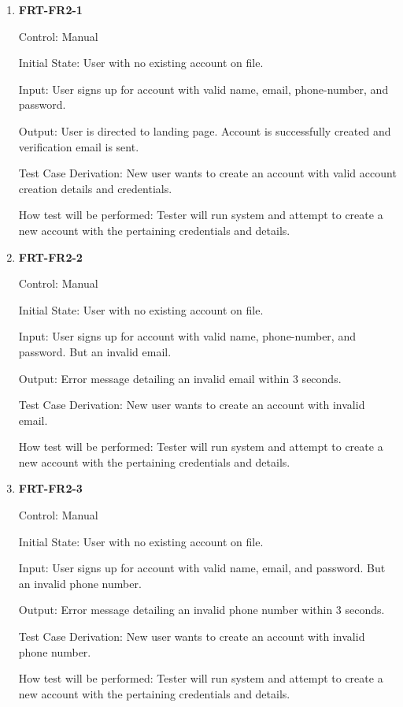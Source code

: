\documentclass[12pt, titlepage]{article}
\begin{document}
\begin{enumerate}

\item{\textbf{FRT-FR2-1}}

Control: Manual
					
Initial State: User with no existing account on file.
					
Input: User signs up for account with valid name, email, phone-number, and password.
					
Output: User is directed to landing page. Account is successfully created and verification email is sent.

Test Case Derivation: New user wants to create an account with valid account creation details and credentials.
					
How test will be performed: Tester will run system and attempt to create a new account with the pertaining credentials and details. 
					
\item{\textbf{FRT-FR2-2}}

Control: Manual
					
Initial State: User with no existing account on file.
					
Input: User signs up for account with valid name, phone-number, and password. But an invalid email.
					
Output: Error message detailing an invalid email within 3 seconds.

Test Case Derivation: New user wants to create an account with invalid email.

How test will be performed: Tester will run system and attempt to create a new account with the pertaining credentials and details. 

\item{\textbf{FRT-FR2-3}}

Control: Manual
          
Initial State: User with no existing account on file.
          
Input: User signs up for account with valid name, email, and password. But an invalid phone number.
          
Output: Error message detailing an invalid phone number within 3 seconds.

Test Case Derivation: New user wants to create an account with invalid phone number.

How test will be performed: Tester will run system and attempt to create a new account with the pertaining credentials and details. 


\end{enumerate}
\end{document}
